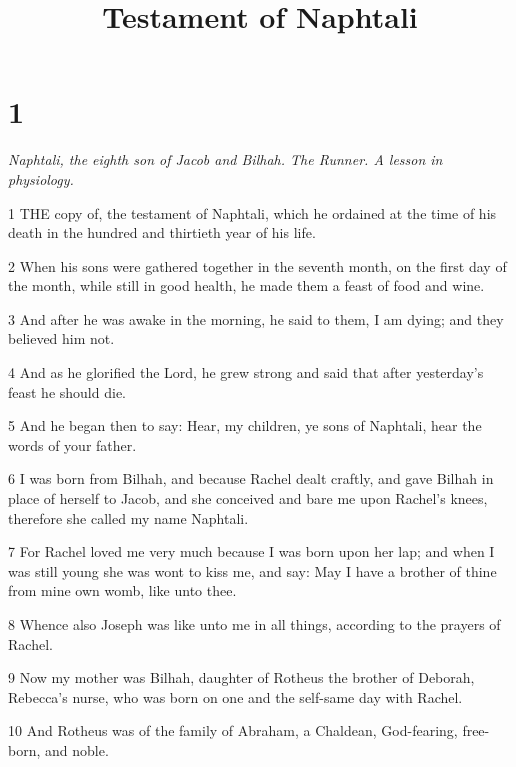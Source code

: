 

\title{Testament of Naphtali}

\chapter{1}

\par \textit{Naphtali, the eighth son of Jacob and Bilhah. The Runner. A lesson in physiology.}

\par 1 THE copy of, the testament of Naphtali, which he ordained at the time of his death in the hundred and thirtieth year of his life.

\par 2 When his sons were gathered together in the seventh month, on the first day of the month, while still in good health, he made them a feast of food and wine.

\par 3 And after he was awake in the morning, he said to them, I am dying; and they believed him not.

\par 4 And as he glorified the Lord, he grew strong and said that after yesterday's feast he should die.

\par 5 And he began then to say: Hear, my children, ye sons of Naphtali, hear the words of your father.

\par 6 I was born from Bilhah, and because Rachel dealt craftly, and gave Bilhah in place of herself to Jacob, and she conceived and bare me upon Rachel's knees, therefore she called my name Naphtali.

\par 7 For Rachel loved me very much because I was born upon her lap; and when I was still young she was wont to kiss me, and say: May I have a brother of thine from mine own womb, like unto thee.

\par 8 Whence also Joseph was like unto me in all things, according to the prayers of Rachel.

\par 9 Now my mother was Bilhah, daughter of Rotheus the brother of Deborah, Rebecca's nurse, who was born on one and the self-same day with Rachel.

\par 10 And Rotheus was of the family of Abraham, a Chaldean, God-fearing, free-born, and noble.

